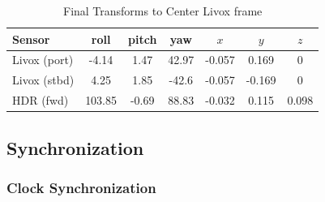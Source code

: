 \documentclass{erauthesis}
\begin{document}
\begin{table}[ht]
\caption{Final Transforms to Center Livox frame}
\label{extrinsics}
\centering
\begin{tabular}{l|cccccc}
Sensor &  roll & pitch & yaw & $x$ & $y$ & $z$\\
\hline \hline 
Livox (port)  & -4.14 & 1.47 & 42.97 & -0.057 & 0.169 & 0\\ \hline
Livox (stbd) & 4.25 & 1.85 & -42.6 & -0.057 & -0.169 & 0\\ \hline
\hline

HDR (fwd) & 103.85 & -0.69 & 88.83 & -0.032 &0.115 & 0.098\\ \hline
\end{tabular} \label{tbl:extrinsic}
\end{table}
            
        \subsection{Synchronization} \label{sync}
        
            \subsubsection{Clock Synchronization} \label{clock_sync}
\end{document}
